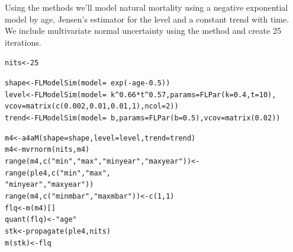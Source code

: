 \documentclass[a4paper,english,10pt]{article}\usepackage[]{graphicx}\usepackage[]{color}
\makeatletter
\newcommand{\hlnum}[1]{\textcolor[rgb]{0.063,0.58,0.627}{#1}}%
\newcommand{\hlstr}[1]{\textcolor[rgb]{0.063,0.58,0.627}{#1}}%
\newcommand{\hlopt}[1]{\textcolor[rgb]{0.196,0.196,0.196}{#1}}%
\newcommand{\hlstd}[1]{\textcolor[rgb]{0.196,0.196,0.196}{#1}}%
\newcommand{\hlkwb}[1]{\textcolor[rgb]{0.627,0,0.314}{#1}}%
\newcommand{\hlkwc}[1]{\textcolor[rgb]{0,0.631,0.314}{#1}}%
\newcommand{\hlkwd}[1]{\textcolor[rgb]{0.78,0.227,0.412}{#1}}%
\newenvironment{kframe}{%
 \def\at@end@of@kframe{}%
 \ifinner\ifhmode%
  \def\at@end@of@kframe{\end{minipage}}%
  \begin{minipage}{\columnwidth}%
 \fi\fi%
 \def\FrameCommand##1{\hskip\@totalleftmargin \hskip-\fboxsep
 \colorbox{shadecolor}{##1}\hskip-\fboxsep
     \hskip-\linewidth \hskip-\@totalleftmargin \hskip\columnwidth}%
 \MakeFramed {\advance\hsize-\width
   \@totalleftmargin\z@ \linewidth\hsize
   \@setminipage}}%
 {\par\unskip\endMakeFramed%
 \at@end@of@kframe}
\newenvironment{knitrout}{}{} %
\makeatother
\begin{document}
Using the \aFa methods we'll model natural mortality using a negative exponential model by age, Jensen's estimator for the level and a constant trend with time. We include multivariate normal uncertainty using the  method and create 25 iterations.

\begin{knitrout}
\color{fgcolor}\begin{kframe}
\begin{alltt}
\hlstd{nits} \hlkwb{<-} \hlnum{25}

\hlstd{shape} \hlkwb{<-} \hlkwd{FLModelSim}\hlstd{(}\hlkwc{model} \hlstd{=} \hlopt{~}\hlkwd{exp}\hlstd{(}\hlopt{-}\hlstd{age} \hlopt{-} \hlnum{0.5}\hlstd{))}
\hlstd{level} \hlkwb{<-} \hlkwd{FLModelSim}\hlstd{(}\hlkwc{model} \hlstd{=} \hlopt{~}\hlstd{k}\hlopt{^}\hlnum{0.66} \hlopt{*} \hlstd{t}\hlopt{^}\hlnum{0.57}\hlstd{,} \hlkwc{params} \hlstd{=} \hlkwd{FLPar}\hlstd{(}\hlkwc{k} \hlstd{=} \hlnum{0.4}\hlstd{,} \hlkwc{t} \hlstd{=} \hlnum{10}\hlstd{),}
    \hlkwc{vcov} \hlstd{=} \hlkwd{matrix}\hlstd{(}\hlkwd{c}\hlstd{(}\hlnum{0.002}\hlstd{,} \hlnum{0.01}\hlstd{,} \hlnum{0.01}\hlstd{,} \hlnum{1}\hlstd{),} \hlkwc{ncol} \hlstd{=} \hlnum{2}\hlstd{))}
\hlstd{trend} \hlkwb{<-} \hlkwd{FLModelSim}\hlstd{(}\hlkwc{model} \hlstd{=} \hlopt{~}\hlstd{b,} \hlkwc{params} \hlstd{=} \hlkwd{FLPar}\hlstd{(}\hlkwc{b} \hlstd{=} \hlnum{0.5}\hlstd{),} \hlkwc{vcov} \hlstd{=} \hlkwd{matrix}\hlstd{(}\hlnum{0.02}\hlstd{))}

\hlstd{m4} \hlkwb{<-} \hlkwd{a4aM}\hlstd{(}\hlkwc{shape} \hlstd{= shape,} \hlkwc{level} \hlstd{= level,} \hlkwc{trend} \hlstd{= trend)}
\hlstd{m4} \hlkwb{<-} \hlkwd{mvrnorm}\hlstd{(nits, m4)}
\hlkwd{range}\hlstd{(m4,} \hlkwd{c}\hlstd{(}\hlstr{"min"}\hlstd{,} \hlstr{"max"}\hlstd{,} \hlstr{"minyear"}\hlstd{,} \hlstr{"maxyear"}\hlstd{))} \hlkwb{<-} \hlkwd{range}\hlstd{(ple4,} \hlkwd{c}\hlstd{(}\hlstr{"min"}\hlstd{,} \hlstr{"max"}\hlstd{,}
    \hlstr{"minyear"}\hlstd{,} \hlstr{"maxyear"}\hlstd{))}
\hlkwd{range}\hlstd{(m4,} \hlkwd{c}\hlstd{(}\hlstr{"minmbar"}\hlstd{,} \hlstr{"maxmbar"}\hlstd{))} \hlkwb{<-} \hlkwd{c}\hlstd{(}\hlnum{1}\hlstd{,} \hlnum{1}\hlstd{)}
\hlstd{flq} \hlkwb{<-} \hlkwd{m}\hlstd{(m4)[]}
\hlkwd{quant}\hlstd{(flq)} \hlkwb{<-} \hlstr{"age"}
\hlstd{stk} \hlkwb{<-} \hlkwd{propagate}\hlstd{(ple4, nits)}
\hlkwd{m}\hlstd{(stk)} \hlkwb{<-} \hlstd{flq}
\end{alltt}
\end{kframe}
\end{knitrout}
\end{document}
